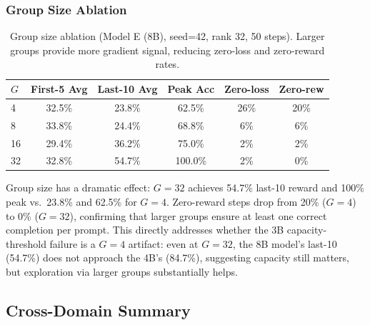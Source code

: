 \documentclass{article}
\begin{document}
\subsubsection{Group Size Ablation}

\begin{table}[htbp]
    \centering
    \caption{Group size ablation (Model E (8B), seed=42, rank 32, 50 steps). Larger groups provide more gradient signal, reducing zero-loss and zero-reward rates.}
    \begin{tabular}{lccccc}
        \toprule
        $G$ & First-5 Avg & Last-10 Avg & Peak Acc & Zero-loss & Zero-rew \\
        \midrule
        4  & 32.5\% & 23.8\% & 62.5\%  & 26\% & 20\% \\
        8  & 33.8\% & 24.4\% & 68.8\%  & 6\%  & 6\% \\
        16 & 29.4\% & 36.2\% & 75.0\%  & 2\%  & 2\% \\
        32 & 32.8\% & 54.7\% & 100.0\% & 2\%  & 0\% \\
        \bottomrule
    \end{tabular}
    \label{tab:group_ablation}
\end{table}

Group size has a dramatic effect: $G{=}32$ achieves 54.7\% last-10 reward and 100\% peak vs.\ 23.8\% and 62.5\% for $G{=}4$. Zero-reward steps drop from 20\% ($G{=}4$) to 0\% ($G{=}32$), confirming that larger groups ensure at least one correct completion per prompt. This directly addresses whether the 3B capacity-threshold failure is a $G{=}4$ artifact: even at $G{=}32$, the 8B model's last-10 (54.7\%) does not approach the 4B's (84.7\%), suggesting capacity still matters, but exploration via larger groups substantially helps.

\subsection{Cross-Domain Summary}
\end{document}
